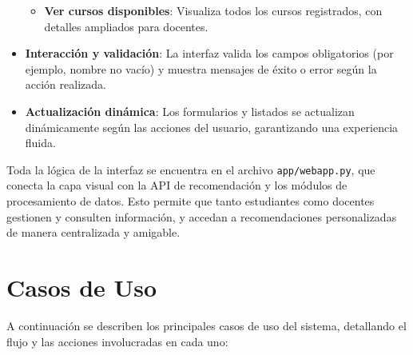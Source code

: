 \documentclass[12pt]{article}
\begin{document}
\begin{itemize}
\begin{itemize}
        \item \textbf{Ver cursos disponibles}: Visualiza todos los cursos registrados, con detalles ampliados para docentes.
    \end{itemize}
    \item \textbf{Interacción y validación}: La interfaz valida los campos obligatorios (por ejemplo, nombre no vacío) y muestra mensajes de éxito o error según la acción realizada.
    \item \textbf{Actualización dinámica}: Los formularios y listados se actualizan dinámicamente según las acciones del usuario, garantizando una experiencia fluida.
\end{itemize}

Toda la lógica de la interfaz se encuentra en el archivo \texttt{app/webapp.py}, que conecta la capa visual con la API de recomendación y los módulos de procesamiento de datos. Esto permite que tanto estudiantes como docentes gestionen y consulten información, y accedan a recomendaciones personalizadas de manera centralizada y amigable.

\section{Casos de Uso}
A continuación se describen los principales casos de uso del sistema, detallando el flujo y las acciones involucradas en cada uno:
\end{document}
